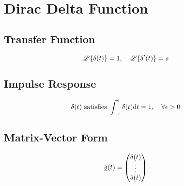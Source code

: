\section*{Dirac Delta Function}
\subsection*{Transfer Function}
\[
    \laplace{\func{\delta}[t]} = 1, \quad \laplace{\func{\delta'}[t]} = s
\]

\subsection*{Impulse Response}
\[
    \delta(t) \text{ satisfies } \int_{-\epsilon}^{\epsilon} \delta(t) \mathrm{d}t = 1, \quad \forall \epsilon > 0
\]

\subsection*{Matrix-Vector Form}
\[
    \func{\underline{\delta}}[t] =
    \crvector{
        \func{\delta}[t] \\
        \vdots \\
        \func{\delta}[t]
    }
\]